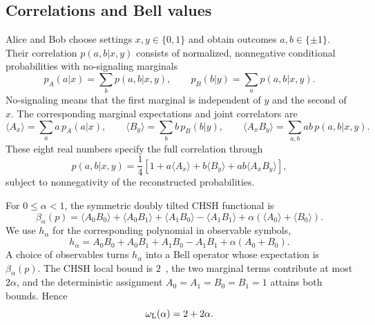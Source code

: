 \documentclass[aps,prl,onecolumn,10pt,superscriptaddress,nofootinbib,longbibliography]{revtex4-2}
\theoremstyle{remark}
\begin{document}
\subsection{Correlations and Bell values}

Alice and Bob choose settings $x,y\in\{0,1\}$ and obtain outcomes $a,b\in\{\pm1\}$. Their correlation $p(a,b|x,y)$ consists of normalized, nonnegative conditional probabilities with no-signaling marginals
\begin{equation}
p_A(a|x)=\sum_b p(a,b|x,y),
\qquad
p_B(b|y)=\sum_a p(a,b|x,y).
\label{supp:eq:nosig-a}
\end{equation}
No-signaling means that the first marginal is independent of $y$ and the second of $x$. The corresponding marginal expectations and joint correlators are
\begin{equation}
\langle A_x\rangle=\sum_a a\,p_A(a|x),
\qquad
\langle B_y\rangle=\sum_b b\,p_B(b|y),
\qquad
\langle A_xB_y\rangle=\sum_{a,b}ab\,p(a,b|x,y).
\label{supp:eq:correlator}
\end{equation}
These eight real numbers specify the full correlation through~\cite{BrunnerEtAl2014}
\begin{equation}
p(a,b|x,y)=\frac14\left[1+a\langle A_x\rangle+b\langle B_y\rangle+ab\langle A_xB_y\rangle\right],
\label{supp:eq:behavior-reconstruction}
\end{equation}
subject to nonnegativity of the reconstructed probabilities.

For $0\leq\alpha<1$, the symmetric doubly tilted CHSH functional is
\begin{equation}
\beta_\alpha(p)=\langle A_0B_0\rangle+\langle A_0B_1\rangle
+\langle A_1B_0\rangle-\langle A_1B_1\rangle
+\alpha(\langle A_0\rangle+\langle B_0\rangle).
\label{supp:eq:bell-functional-on-behaviors}
\end{equation}
We use $h_\alpha$ for the corresponding polynomial in observable symbols,
\begin{equation}
h_\alpha=A_0B_0+A_0B_1+A_1B_0-A_1B_1+\alpha(A_0+B_0).
\label{supp:eq:bell-functional}
\end{equation}
A choice of observables turns $h_\alpha$ into a Bell operator whose expectation is $\beta_\alpha(p)$. The CHSH local bound is $2$~\cite{CHSH1969}, the two marginal terms contribute at most $2\alpha$, and the deterministic assignment $A_0=A_1=B_0=B_1=1$ attains both bounds. Hence
\begin{equation}
\omega_{\rm L}(\alpha)=2+2\alpha.
\label{supp:eq:local-value}
\end{equation}
\end{document}
